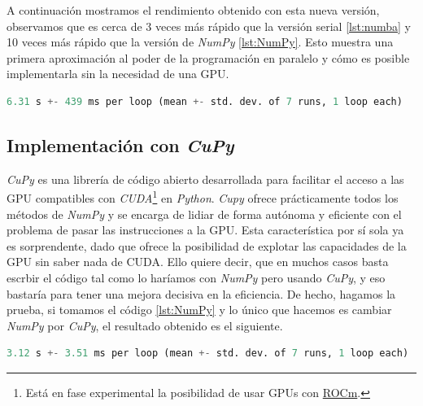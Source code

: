 A continuación mostramos el rendimiento obtenido con esta nueva versión, observamos que es cerca de 3 veces más rápido que la versión serial \ref{lst:numba} y 
10 veces más rápido que la versión de \textit{NumPy} \ref{lst:NumPy}. Esto muestra una primera aproximación al poder de la programación en paralelo y cómo es 
posible implementarla sin la necesidad de una GPU.

\begin{lstlisting}[language=Python,label = {lst:numba_p_re}]
%timeit cpu_numba_parallel_solver(u,v,fu,fv,Ds)
6.31 s +- 439 ms per loop (mean +- std. dev. of 7 runs, 1 loop each)
\end{lstlisting}

\subsection{Implementación con \textit{CuPy}}

\textit{CuPy} es una librería de código abierto desarrollada para facilitar el acceso a las GPU compatibles con \textit{CUDA}\footnote{Está en fase experimental la posibilidad 
de usar GPUs con \href{https://rocmdocs.amd.com/en/latest/}{ROCm}.} en \textit{Python}. \textit{Cupy} ofrece prácticamente todos los métodos de 
\textit{NumPy} y se encarga de lidiar de forma autónoma y eficiente con el problema de pasar las instrucciones a la GPU. Esta característica por sí 
sola ya es sorprendente, dado que ofrece la posibilidad de explotar las capacidades de la GPU sin saber nada de CUDA. Ello quiere decir, que en muchos 
casos basta escrbir el código tal como lo haríamos con \textit{NumPy} pero usando \textit{CuPy}, y eso bastaría para tener una mejora decisiva en la 
eficiencia. De hecho, hagamos la prueba, si tomamos el código \ref{lst:NumPy} y lo único que hacemos es cambiar \textit{NumPy} por \textit{CuPy}, el 
resultado obtenido es el siguiente.

\begin{lstlisting}[language=Python,label = {lst:cupy}]
%timeit gpu_simple_cupy_solver(u,v,fu,fv,Ds)
3.12 s +- 3.51 ms per loop (mean +- std. dev. of 7 runs, 1 loop each)
\end{lstlisting}

